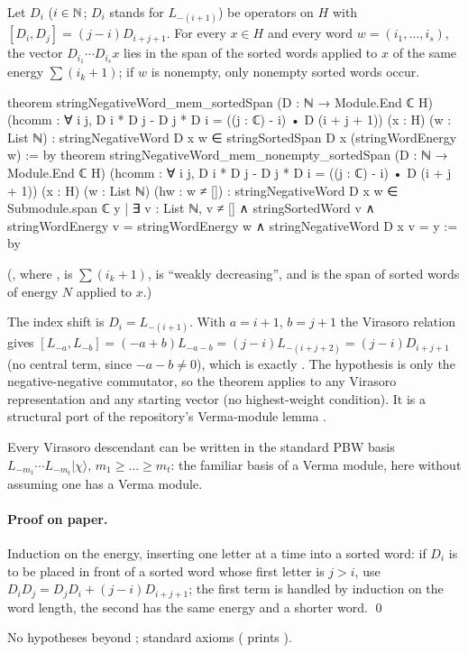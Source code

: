 \begin{theorem}[Straightening]\label{ch18:thm:straightening}
Let $D_i$ ($i\in{\mathbb{N}}$; $D_i$ stands for $L_{-(i+1)}$) be operators on $H$ with
$[D_i,D_j]=(j-i)D_{i+j+1}$.  For every $x\in H$ and every word $w=(i_1,\dots,i_s)$, the vector
$D_{i_1}\cdots D_{i_s}x$ lies in the span of the sorted words applied to $x$ of the same energy
$\sum(i_k+1)$; if $w$ is nonempty, only nonempty sorted words occur.
\end{theorem}
\begin{leancode}
theorem stringNegativeWord_mem_sortedSpan (D : ℕ → Module.End ℂ H)
    (hcomm : ∀ i j, D i * D j - D j * D i = ((j : ℂ) - i) • D (i + j + 1))
    (x : H) (w : List ℕ) :
    stringNegativeWord D x w ∈ stringSortedSpan D x (stringWordEnergy w) := by
theorem stringNegativeWord_mem_nonempty_sortedSpan (D : ℕ → Module.End ℂ H)
    (hcomm : ∀ i j, D i * D j - D j * D i = ((j : ℂ) - i) • D (i + j + 1))
    (x : H) (w : List ℕ) (hw : w ≠ []) :
    stringNegativeWord D x w ∈ Submodule.span ℂ {y | ∃ v : List ℕ,
      v ≠ [] ∧ stringSortedWord v ∧ stringWordEnergy v = stringWordEnergy w ∧
        stringNegativeWord D x v = y} := by
\end{leancode}
(, where
,  is
$\sum(i_k+1)$,  is ``weakly decreasing'', and  is
the span of sorted words of energy $N$ applied to $x$.)
\begin{dictionary}
The index shift is $D_i=L_{-(i+1)}$.  With $a=i+1$, $b=j+1$ the Virasoro relation gives
$[L_{-a},L_{-b}]=(-a+b)L_{-a-b}=(j-i)L_{-(i+j+2)}=(j-i)D_{i+j+1}$ (no central term, since $-a-b\neq0$),
which is exactly .  The hypothesis is only the negative-negative commutator, so the theorem applies to any
Virasoro representation and any starting vector (no highest-weight condition).  It is a structural port
of the repository's Verma-module lemma .
\end{dictionary}
\begin{physics}
Every Virasoro descendant can be written in the standard PBW basis $L_{-m_1}\cdots L_{-m_t}|\chi\rangle$,
$m_1\ge\dots\ge m_t$: the familiar basis of a Verma module, here without assuming one has a Verma module.
\end{physics}
\paragraph{Proof on paper.}  Induction on the energy, inserting one letter at a time into a sorted word:
if $D_i$ is to be placed in front of a sorted word whose first letter is $j>i$, use
$D_iD_j=D_jD_i+(j-i)D_{i+j+1}$; the first term is handled by induction on the word length, the second has
the same energy and a shorter word. \qed
\begin{status}No hypotheses beyond ; standard axioms ( prints
).\end{status}

